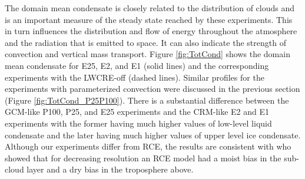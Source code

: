 \documentclass[draft]{agujournal2019}
\begin{document}
{The domain mean condensate is closely related to the distribution of clouds and is an important measure of the 
steady state reached by these experiments.  This in turn influences 
the distribution and flow of energy throughout the atmosphere and the radiation that is emitted to space.  
It can also indicate the strength of convection and vertical mass transport.     
Figure \ref{fig:TotCond} shows the domain mean condensate for E25, E2, and E1
(solid lines) and the corresponding experiments with the LWCRE-off (dashed lines).  Similar profiles for the experiments
with parameterized convection were discussed in the previous section (Figure \ref{fig:TotCond_P25P100}).  
There is a substantial difference between the GCM-like P100, P25, and E25 experiments and the CRM-like E2 and E1 experiments 
with the former having much higher values of low-level liquid condensate and the later having much higher values of upper level ice condensate.  Although our experiments differ from RCE, the results are consistent with  who showed that for 
decreasing resolution an RCE model had a moist bias in the sub-cloud layer and a dry bias in the troposphere above.  

}
\end{document}
